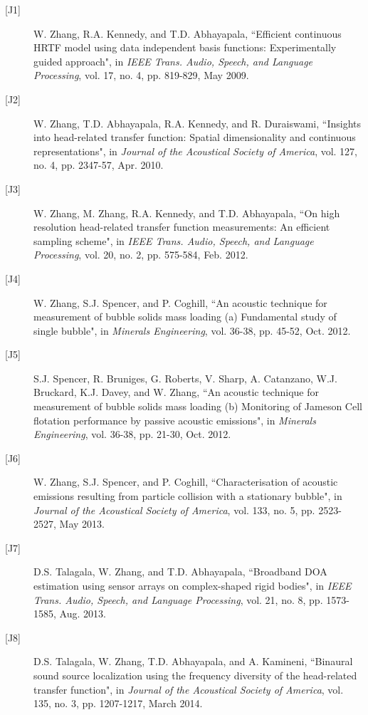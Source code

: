 \documentclass[10pt]{article}
\begin{document}
\begin{description}

\item[{[}J1{]}]W. Zhang, R.A. Kennedy, and T.D. Abhayapala,
``Efficient continuous HRTF model using data independent basis functions: Experimentally guided approach", in {\em
IEEE Trans. Audio, Speech, and Language Processing}, vol. 17, no. 4, pp. 819-829, May 2009.

\item[{[}J2{]}]W. Zhang, T.D. Abhayapala, R.A. Kennedy, and R. Duraiswami,
``Insights into head-related transfer function: Spatial dimensionality and continuous representations",
in \emph{Journal of the Acoustical Society of America}, vol. 127, no. 4, pp. 2347-57, Apr. 2010.

\item[{[}J3{]}]W. Zhang, M. Zhang, R.A. Kennedy, and T.D. Abhayapala, ``On high resolution head-related transfer function measurements: An efficient sampling scheme", in \emph{IEEE Trans. Audio, Speech, and Language Processing}, vol. 20, no. 2, pp. 575-584, Feb. 2012.

\item[{[}J4{]}]W. Zhang, S.J. Spencer, and P. Coghill,
``An acoustic technique for measurement of bubble solids mass loading (a) Fundamental study of single bubble", in {\em Minerals Engineering}, vol. 36-38, pp. 45-52, Oct. 2012.

\item[{[}J5{]}]S.J. Spencer, R. Bruniges, G. Roberts, V. Sharp, A. Catanzano, W.J. Bruckard, K.J. Davey, and W. Zhang,
``An acoustic technique for measurement of bubble solids mass loading (b) Monitoring of Jameson Cell flotation performance by passive acoustic emissions", in {\em Minerals Engineering}, vol. 36-38, pp. 21-30, Oct. 2012.

\item[{[}J6{]}]W. Zhang, S.J. Spencer, and P. Coghill, ``Characterisation of acoustic emissions resulting from particle collision with a stationary bubble", in {\em Journal of the Acoustical Society of America}, vol. 133, no. 5, pp. 2523-2527, May 2013.

\item[{[}J7{]}]D.S. Talagala, W. Zhang, and T.D. Abhayapala, ``Broadband DOA estimation using sensor arrays on complex-shaped rigid bodies", in {\em IEEE Trans. Audio, Speech, and Language Processing}, vol. 21, no. 8, pp. 1573-1585, Aug. 2013.

\item[{[}J8{]}]D.S. Talagala, W. Zhang, T.D. Abhayapala, and A. Kamineni, ``Binaural sound source localization using the frequency diversity of the head-related transfer function", in {\em Journal of the Acoustical Society of America}, vol. 135, no. 3, pp. 1207-1217, March 2014.


\end{description}
\end{document}
